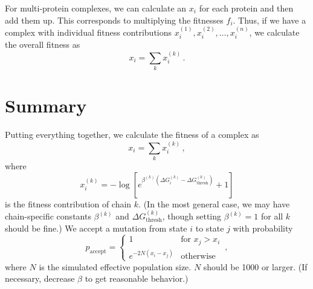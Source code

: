 \documentclass[12pt]{article}
\begin{document}
For multi-protein complexes, we can calculate an $x_i$ for each protein and then add them up. This corresponds to multiplying the fitnesses $f_i$. Thus, if we have a complex with individual fitness contributions $x_i^{(1)}, x_i^{(2)}, \dots, x_i^{(n)}$, we calculate the overall fitness as
\begin{equation}
  x_i = \sum_k x_i^{(k)}\,. 
\end{equation}

\section{Summary}

Putting everything together, we calculate the fitness of a complex as
\begin{equation}
  x_i = \sum_k x_i^{(k)}\,, 
\end{equation}
where
\begin{equation}
  x_i^{(k)}= -\log[e^{\beta^{(k)}(\Delta G_i^{(k)}-\Delta G^{(k)}_\text{thresh})} + 1]
\end{equation}
is the fitness contribution of chain $k$. (In the most general case, we may have chain-specific constants $\beta^{(k)}$ and $\Delta G^{(k)}_\text{thresh}$, though setting $\beta^{(k)}=1$ for all $k$ should be fine.) We accept a mutation from state $i$ to state $j$ with probability
\begin{equation}
  p_\text{accept} = \begin{cases}
        1 & \text{for $x_j>x_i$} \\
        e^{-2N(x_i-x_j)} & \text{otherwise}
      \end{cases}\,,
\end{equation}
where $N$ is the simulated effective population size. $N$ should be 1000 or larger. (If necessary, decrease $\beta$ to get reasonable behavior.)
\end{document}
